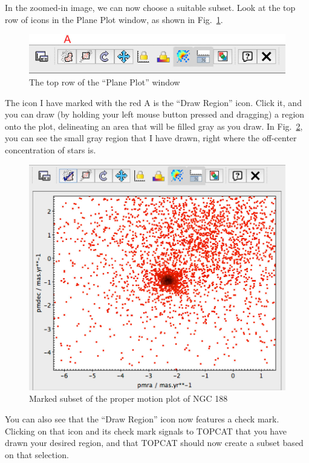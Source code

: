 \documentclass[twocolumn,apj]{openjournal}
\begin{document}
In the zoomed-in image, we can now choose a suitable subset. Look at the top row of icons in the Plane Plot window, as shown in Fig.~\ref{PlanePlotTopRow}.
\begin{figure}[htbp]
\begin{center}
\includegraphics[width=\linewidth]{planePlotTopRow.jpg}
\caption{The top row of the ``Plane Plot'' window}
\label{PlanePlotTopRow}
\end{center}
\end{figure}
The icon I have marked with the red A is the ``Draw Region'' icon. Click it, and you can draw (by holding your left mouse button pressed and dragging) a region onto the plot, delineating an area that will be filled gray as you draw. In Fig.~\ref{NGC188Drawn}, you can see the small gray region that I have drawn, right where the off-center concentration of stars is. 
\begin{figure}[htbp]
\begin{center}
\includegraphics[width=\linewidth]{ngc188pmMarked.jpg}
\caption{Marked subset of the proper motion plot of NGC 188}
\label{NGC188Drawn}
\end{center}
\end{figure}
You can also see that the ``Draw Region'' icon now features a check mark. Clicking on that icon and its check mark signals to TOPCAT that you have drawn your desired region, and that TOPCAT should now create a subset based on that selection.
\end{document}
